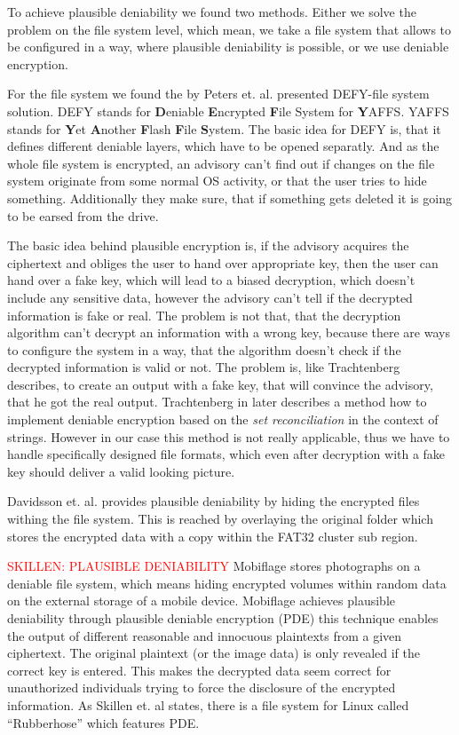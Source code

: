 \documentclass[12pt,a4paper,titlepage,oneside]{scrartcl}
\newcommand\todo[1]{\textcolor{red}{#1}}
\begin{document}
To achieve plausible deniability we found two methods.
Either we solve the problem on the file system level, which mean, we take a file system that allows to be configured in a way, where plausible deniability is possible, or we use deniable encryption.

For the file system we found the by Peters et. al. presented DEFY-file system solution.
DEFY stands for \textbf{D}eniable \textbf{E}ncrypted \textbf{F}ile System for \textbf{Y}AFFS.
YAFFS stands for \textbf{Y}et \textbf{A}nother \textbf{F}lash \textbf{F}ile \textbf{S}ystem.
The basic idea for DEFY is, that it defines different deniable layers, which have to be opened separatly.
And as the whole file system is encrypted, an advisory can't find out if changes on the file system originate from some normal OS activity, or that the user tries to hide something.
Additionally they make sure, that if something gets deleted it is going to be earsed from the drive. \cite{peters2015defy}

The basic idea behind plausible encryption is, if the advisory acquires the ciphertext and obliges the user to hand over appropriate key, then the user can hand over a fake key, which will lead to a biased decryption, which doesn't include any sensitive data, however the advisory can't tell if the decrypted information is fake or real. \cite{canetti1997deniable}
The problem is not that, that the decryption algorithm can't decrypt an information with a wrong key, because there are ways to configure the system in a way, that the algorithm doesn't check if the decrypted information is valid or not.
The problem is, like Trachtenberg describes, to create an output with a fake key, that will convince the advisory, that he got the real output. \cite{trachtenbergsay}
Trachtenberg in \cite{trachtenbergsay} later describes a method how to implement deniable encryption based on the \textit{set reconciliation} in the context of strings.
However in our case this method is not really applicable, thus we have to handle specifically designed file formats, which even after decryption with a fake key should deliver a valid looking picture.

Davidsson et. al. provides plausible deniability by hiding the encrypted files withing the file system.
This is reached by overlaying the original folder which stores the encrypted data with a copy within the FAT32 cluster sub region. \cite{Davidsson2016}

\todo{SKILLEN: PLAUSIBLE DENIABILITY}
Mobiflage stores photographs on a deniable file system, which means hiding encrypted volumes within random data on the external storage of a mobile device.
Mobiflage achieves plausible deniability through plausible deniable encryption (PDE) this technique enables the output of different reasonable and innocuous plaintexts from a given ciphertext.
The original plaintext (or the image data) is only revealed if the correct key is entered.
This makes the decrypted data seem correct for unauthorized individuals trying to force the disclosure of the encrypted information.
As Skillen et. al states, there is a file system for Linux called ``Rubberhose'' which features PDE.
\end{document}
